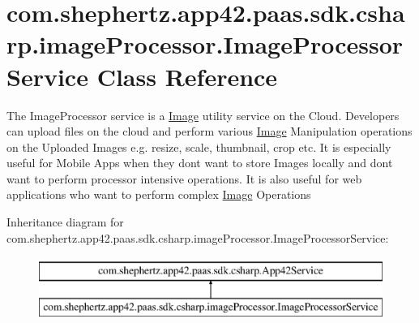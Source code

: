 \hypertarget{classcom_1_1shephertz_1_1app42_1_1paas_1_1sdk_1_1csharp_1_1image_processor_1_1_image_processor_service}{\section{com.\+shephertz.\+app42.\+paas.\+sdk.\+csharp.\+image\+Processor.\+Image\+Processor\+Service Class Reference}
\label{classcom_1_1shephertz_1_1app42_1_1paas_1_1sdk_1_1csharp_1_1image_processor_1_1_image_processor_service}
}


The Image\+Processor service is a \hyperlink{classcom_1_1shephertz_1_1app42_1_1paas_1_1sdk_1_1csharp_1_1image_processor_1_1_image}{Image} utility service on the Cloud. Developers can upload files on the cloud and perform various \hyperlink{classcom_1_1shephertz_1_1app42_1_1paas_1_1sdk_1_1csharp_1_1image_processor_1_1_image}{Image} Manipulation operations on the Uploaded Images e.\+g. resize, scale, thumbnail, crop etc. It is especially useful for Mobile Apps when they dont want to store Images locally and dont want to perform processor intensive operations. It is also useful for web applications who want to perform complex \hyperlink{classcom_1_1shephertz_1_1app42_1_1paas_1_1sdk_1_1csharp_1_1image_processor_1_1_image}{Image} Operations  


Inheritance diagram for com.\+shephertz.\+app42.\+paas.\+sdk.\+csharp.\+image\+Processor.\+Image\+Processor\+Service\+:\begin{figure}[H]
\begin{center}
\leavevmode
\includegraphics[height=2.000000cm]{classcom_1_1shephertz_1_1app42_1_1paas_1_1sdk_1_1csharp_1_1image_processor_1_1_image_processor_service}
\end{center}
\end{figure}
